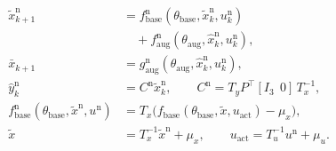 \begin{equation}
\begin{aligned}
 \tilde x^{\mathrm n}_{k+1}
 &=f^{\mathrm n}_{\mathrm{base}}(\theta_{\mathrm{base}},\tilde x^{\mathrm n}_k,u^{\mathrm n}_k)\\
 &\quad+f^{\mathrm n}_{\mathrm{aug}}(\theta_{\mathrm{aug}},\hat x^{\mathrm n}_k,u^{\mathrm n}_k),\\
 \bar x_{k+1}
 &=g^{\mathrm n}_{\mathrm{aug}}(\theta_{\mathrm{aug}},\hat x^{\mathrm n}_k,u^{\mathrm n}_k),\\
 \hat y^{\mathrm n}_k&=C^{\mathrm n}\tilde x^{\mathrm n}_k,\qquad
 C^{\mathrm n}=T_yP^\top[I_3\;\,0]\,T_x^{-1},\\
 f^{\mathrm n}_{\mathrm{base}}(\theta_{\mathrm{base}},\tilde x^{\mathrm n},u^{\mathrm n})
 &=T_x\bigl(f_{\mathrm{base}}(\theta_{\mathrm{base}},\tilde x,u_{\mathrm{act}})-\mu_x\bigr),\\
 \tilde x&=T_x^{-1}\tilde x^{\mathrm n}+\mu_x,\qquad
 u_{\mathrm{act}}=T_u^{-1}u^{\mathrm n}+\mu_u.
\end{aligned}
\label{eq:aug_norm_maps}
\end{equation}
